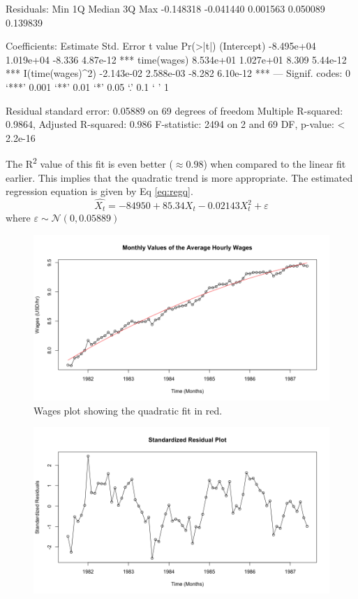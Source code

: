 \begin{enumerate}[label=(\alph*)]
\begin{block}
Residuals:
      Min        1Q    Median        3Q       Max 
-0.148318 -0.041440  0.001563  0.050089  0.139839 

Coefficients:
                   Estimate Std. Error t value Pr(>|t|)    
(Intercept)      -8.495e+04  1.019e+04  -8.336 4.87e-12 ***
time(wages)       8.534e+01  1.027e+01   8.309 5.44e-12 ***
I(time(wages)^2) -2.143e-02  2.588e-03  -8.282 6.10e-12 ***
---
Signif. codes:  0 ‘***’ 0.001 ‘**’ 0.01 ‘*’ 0.05 ‘.’ 0.1 ‘ ’ 1

Residual standard error: 0.05889 on 69 degrees of freedom
Multiple R-squared:  0.9864,	Adjusted R-squared:  0.986 
F-statistic:  2494 on 2 and 69 DF,  p-value: < 2.2e-16
\end{block}  
\normalsize
The R\textsuperscript{2} value of this fit is even better ($\approx 0.98$) when compared to the linear fit earlier. This implies that the quadratic trend is more appropriate. The estimated regression equation is given by Eq \eqref{eq:regq}.
    \begin{equation}
    \label{eq:regq}
        \widehat{X_t} = -84950 + 85.34X_t - 0.02143X^2_t + \varepsilon
    \end{equation}
    where $\varepsilon \sim \mathcal{N}(0, 0.05889)$ 
    \begin{figure}[!h]
        \centering
        \includegraphics[width=0.9\linewidth]{Images/P1/Q_Fit.png}
        \caption{Wages plot showing the quadratic fit in red.}
        \label{fig:qfit}
    \end{figure}
    \begin{figure}[!h]
        \centering
        \includegraphics[width=0.9\linewidth]{Images/P1/SR_plot_q.png}

\end{figure}
\end{enumerate}
